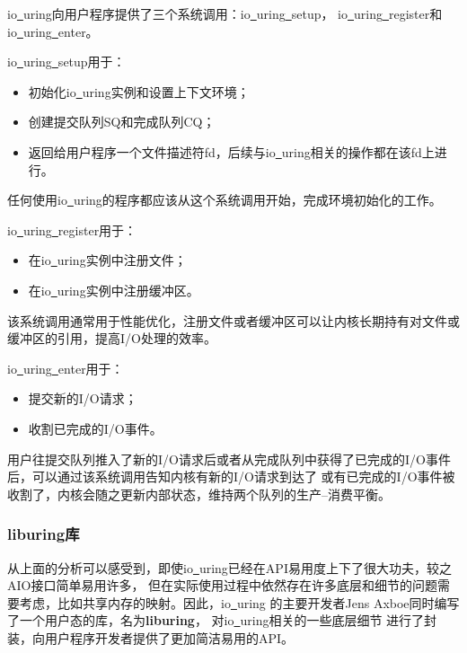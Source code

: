 \documentclass[supercite]{HustGraduPaper}
\theoremstyle{definition}
\begin{document}
io\underline{~}uring向用户程序提供了三个系统调用：io\underline{~}uring\underline{~}setup，
io\underline{~}uring\underline{~}register和io\underline{~}uring\underline{~}enter。\par

io\underline{~}uring\underline{~}setup用于：

\begin{itemize}
  \item 初始化io\underline{~}uring实例和设置上下文环境；
  \item 创建提交队列SQ和完成队列CQ；
  \item 返回给用户程序一个文件描述符fd，后续与io\underline{~}uring相关的操作都在该fd上进行。
\end{itemize}

任何使用io\underline{~}uring的程序都应该从这个系统调用开始，完成环境初始化的工作。\par

io\underline{~}uring\underline{~}register用于：
\begin{itemize}
  \item 在io\underline{~}uring实例中注册文件；
  \item 在io\underline{~}uring实例中注册缓冲区。
\end{itemize}

该系统调用通常用于性能优化，注册文件或者缓冲区可以让内核长期持有对文件或缓冲区的引用，提高I/O处理的效率。\par

io\underline{~}uring\underline{~}enter用于：
\begin{itemize}
  \item 提交新的I/O请求；
  \item 收割已完成的I/O事件。
\end{itemize}

用户往提交队列推入了新的I/O请求后或者从完成队列中获得了已完成的I/O事件后，可以通过该系统调用告知内核有新的I/O请求到达了
或有已完成的I/O事件被收割了，内核会随之更新内部状态，维持两个队列的生产--消费平衡。\par

\subsubsection{liburing库}
从上面的分析可以感受到，即使io\underline{~}uring已经在API易用度上下了很大功夫，较之AIO接口简单易用许多，
但在实际使用过程中依然存在许多底层和细节的问题需要考虑，比如共享内存的映射。因此，io\underline{~}uring
的主要开发者Jens Axboe同时编写了一个用户态的库，名为\textbf{liburing}，
对io\underline{~}uring相关的一些底层细节
进行了封装，向用户程序开发者提供了更加简洁易用的API。\par
\end{document}
